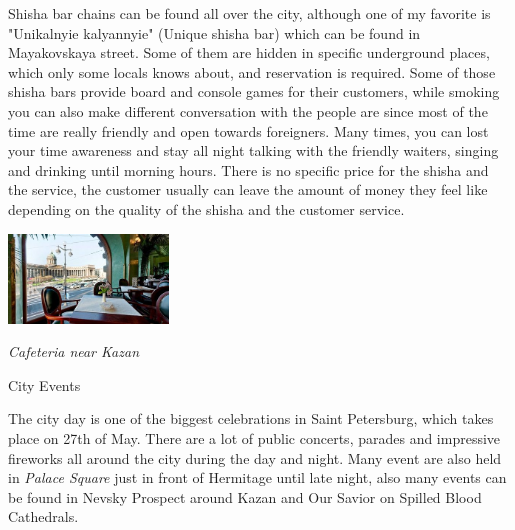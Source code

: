 \documentclass[10pt,a4paper]{article} %
\newcommand{\NewsItem}[1]{ %
\usefont{T1}{fvs}{n}{n} %
\vspace{24pt}\large #1\vspace{3pt} %
\par \normalsize \normalfont}
\begin{document}
\begin{multicols}{3}
Shisha bar chains can be found all over the city, 
although one of my favorite is "Unikalnyie kalyannyie" (Unique shisha bar) 
which can be found in Mayakovskaya street. 
Some of them are hidden in specific underground places, which only some locals knows about, 
and reservation is required. 
Some of those shisha bars provide board and console games for their customers, 
while smoking you can also make different conversation with the people 
are since most of the time are really friendly and open towards foreigners. 
Many times, you can lost your time awareness and stay all night talking with the friendly waiters, 
singing and drinking until morning hours. 
There is no specific price for the shisha and the service, 
the customer usually can leave the amount of money they feel like depending 
on the quality of the shisha and the customer service.

\begin{center}
	\includegraphics[width=0.32\textwidth]{media/cafe.jpg}
	\par\textit{Cafeteria near Kazan}
\end{center}

\NewsItem{City Events}

The city day is one of the biggest celebrations in Saint Petersburg, 
which takes place on 27th of May. 
There are a lot of public concerts, parades and impressive fireworks all around 
the city during the day and night. 
Many event are also held in \textit{Palace Square} just in front of Hermitage 
until late night, also many events can be found in Nevsky Prospect 
around Kazan and Our Savior on Spilled Blood Cathedrals.


\end{multicols}
\end{document}
